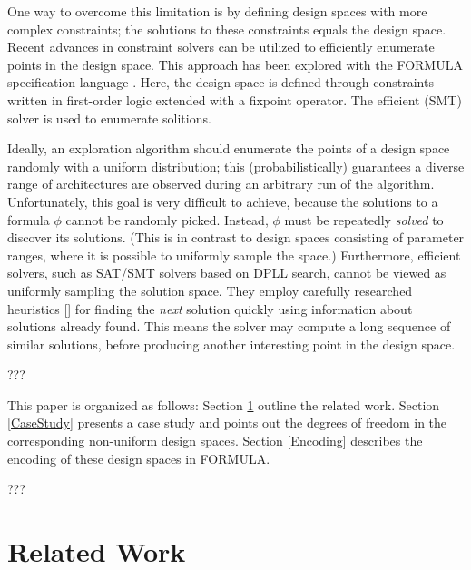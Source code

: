 \documentclass[conference]{IEEEtran}
\newcommand{\FORMULA}{FORMULA}%
\begin{document}
One way to overcome this limitation is by defining design spaces with more complex constraints; the solutions to these constraints equals the design space. Recent advances in constraint solvers can be utilized to efficiently enumerate points in the design space. This approach has been explored with the FORMULA specification language \cite{Jackson2009}. Here, the design space is defined through constraints written in first-order logic extended with a fixpoint operator. The efficient  (SMT) solver is used to enumerate solitions.

Ideally, an exploration algorithm should enumerate the points of a design space randomly with a uniform distribution; this (probabilistically) guarantees a diverse range of architectures are observed during an arbitrary run of the algorithm. Unfortunately, this goal is very difficult to achieve, because the solutions to a formula $\phi$ cannot be randomly picked. Instead, $\phi$ must be repeatedly \textit{solved} to discover its solutions. (This is in contrast to design spaces consisting of parameter ranges, where it is possible to uniformly sample the space.) Furthermore, efficient solvers, such as SAT/SMT solvers based on DPLL search, cannot be viewed as uniformly sampling the solution space. They employ carefully researched heuristics [] for finding the \textit{next} solution quickly using information about solutions already found. This means the solver may compute a long sequence of similar solutions, before producing another interesting point in the design space.

???


This paper is organized as follows: Section \ref{RelatedWork} outline the related work. Section \ref{CaseStudy} presents a case study and points out the degrees of freedom in the corresponding non-uniform design spaces. Section \ref{Encoding} describes the encoding of these design spaces in \FORMULA{}.

???

\section{Related Work} \label{RelatedWork}
\end{document}
